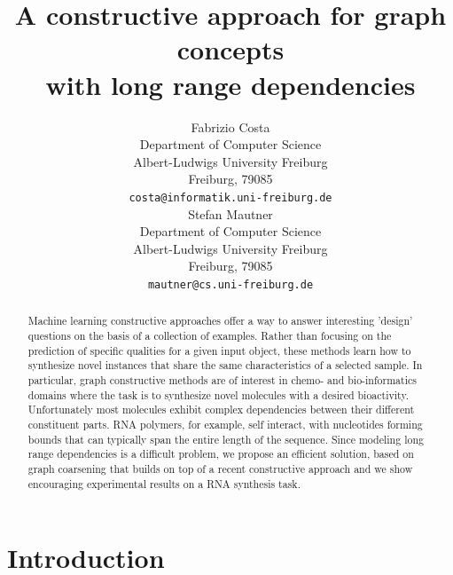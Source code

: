 \documentclass{article}
\title{A constructive approach for graph concepts\\with long range dependencies}
\author{
  Fabrizio Costa \\
  Department of Computer Science\\
  Albert-Ludwigs University Freiburg\\
  Freiburg, 79085  \\
  \texttt{costa@informatik.uni-freiburg.de} \\
  \And
  Stefan Mautner\\
  Department of Computer Science\\
  Albert-Ludwigs University Freiburg\\
  Freiburg, 79085  \\
  \texttt{mautner@cs.uni-freiburg.de} \\
}
\begin{document}

\maketitle

\begin{abstract}

Machine learning constructive approaches offer a way to answer interesting
'design' questions on the basis of a collection of examples. Rather than
focusing on the prediction of specific qualities for a given input object,
these methods learn how to synthesize novel instances that share the same
characteristics of a selected sample. In particular, graph constructive
methods are of interest in chemo- and bio-informatics domains where the task
is to synthesize novel molecules with a desired bioactivity. Unfortunately
most molecules exhibit complex dependencies between their different
constituent parts. RNA polymers, for example, self interact, with nucleotides
forming bounds that can typically span the entire length of the sequence.
Since modeling long range dependencies is a difficult problem, we propose an
efficient solution, based on graph coarsening that builds on top of a recent
constructive approach and we show encouraging experimental results on a RNA
synthesis task.





\end{abstract}
\section{Introduction}
\end{document}
